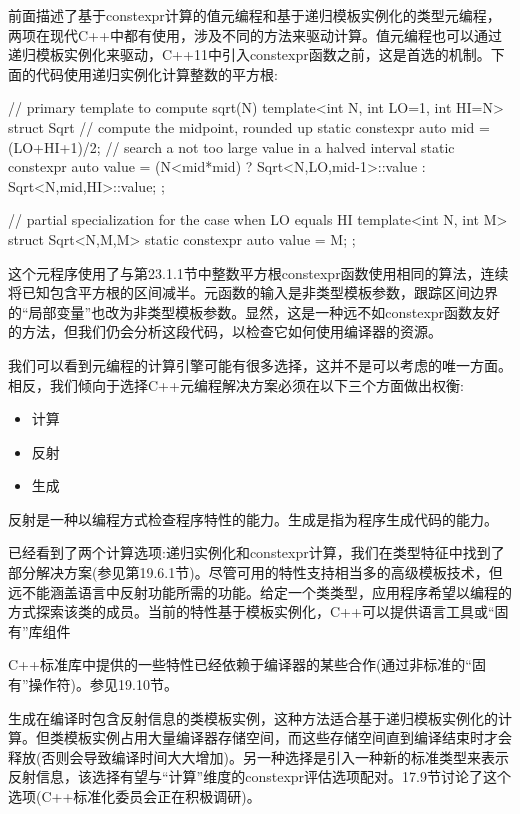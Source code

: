前面描述了基于constexpr计算的值元编程和基于递归模板实例化的类型元编程，两项在现代C++中都有使用，涉及不同的方法来驱动计算。值元编程也可以通过递归模板实例化来驱动，C++11中引入constexpr函数之前，这是首选的机制。下面的代码使用递归实例化计算整数的平方根:

\begin{cpp}
// primary template to compute sqrt(N)
template<int N, int LO=1, int HI=N>
struct Sqrt {
	// compute the midpoint, rounded up
	static constexpr auto mid = (LO+HI+1)/2;
	// search a not too large value in a halved interval
	static constexpr auto value = (N<mid*mid) ? Sqrt<N,LO,mid-1>::value
	: Sqrt<N,mid,HI>::value;
};

// partial specialization for the case when LO equals HI
template<int N, int M>
struct Sqrt<N,M,M> {
	static constexpr auto value = M;
};
\end{cpp}

这个元程序使用了与第23.1.1节中整数平方根constexpr函数使用相同的算法，连续将已知包含平方根的区间减半。元函数的输入是非类型模板参数，跟踪区间边界的“局部变量”也改为非类型模板参数。显然，这是一种远不如constexpr函数友好的方法，但我们仍会分析这段代码，以检查它如何使用编译器的资源。

我们可以看到元编程的计算引擎可能有很多选择，这并不是可以考虑的唯一方面。相反，我们倾向于选择C++元编程解决方案必须在以下三个方面做出权衡:

\begin{itemize}
\item 
计算

\item 
反射

\item 
生成
\end{itemize}

反射是一种以编程方式检查程序特性的能力。生成是指为程序生成代码的能力。

已经看到了两个计算选项:递归实例化和constexpr计算，我们在类型特征中找到了部分解决方案(参见第19.6.1节)。尽管可用的特性支持相当多的高级模板技术，但远不能涵盖语言中反射功能所需的功能。给定一个类类型，应用程序希望以编程的方式探索该类的成员。当前的特性基于模板实例化，C++可以提供语言工具或“固有”库组件

\begin{notice}C++标准库中提供的一些特性已经依赖于编译器的某些合作(通过非标准的“固有”操作符)。参见19.10节。
\end{notice}

生成在编译时包含反射信息的类模板实例，这种方法适合基于递归模板实例化的计算。但类模板实例占用大量编译器存储空间，而这些存储空间直到编译结束时才会释放(否则会导致编译时间大大增加)。另一种选择是引入一种新的标准类型来表示反射信息，该选择有望与“计算”维度的constexpr评估选项配对。17.9节讨论了这个选项(C++标准化委员会正在积极调研)。

